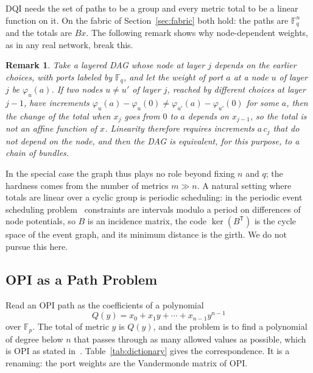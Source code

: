 \documentclass[journal]{IEEEtran}
\newtheorem{remark}{Remark}
\begin{document}
DQI needs the set of paths to be a group and every metric total to be a linear function on it. On the fabric of Section~\ref{sec:fabric} both hold: the paths are $\mathbb{F}_{q}^{n}$ and the totals are $Bx$. The following remark shows why node-dependent weights, as in any real network, break this.

\begin{remark}\label{rem:linear}
Take a layered DAG whose node at layer $j$ depends on the earlier choices, with ports labeled by $\mathbb{F}_{q}$, and let the weight of port $a$ at a node $u$ of layer $j$ be $\varphi_{u}(a)$. If two nodes $u\neq u'$ of layer $j$, reached by different choices at layer $j-1$, have increments $\varphi_{u}(a)-\varphi_{u}(0)\neq\varphi_{u'}(a)-\varphi_{u'}(0)$ for some $a$, then the change of the total when $x_{j}$ goes from $0$ to $a$ depends on $x_{j-1}$, so the total is not an affine function of $x$. Linearity therefore requires increments $a\,c_{j}$ that do not depend on the node, and then the DAG is equivalent, for this purpose, to a chain of bundles.
\end{remark}

In the special case the graph thus plays no role beyond fixing $n$ and $q$; the hardness comes from the number of metrics $m\gg n$. A natural setting where totals are linear over a cyclic group is periodic scheduling: in the periodic event scheduling problem~\cite{serafini1989} constraints are intervals modulo a period on differences of node potentials, so $B$ is an incidence matrix, the code $\ker(B^{\mathsf T})$ is the cycle space of the event graph, and its minimum distance is the girth. We do not pursue this here.

\subsection{OPI as a Path Problem}

Read an OPI path as the coefficients of a polynomial
\begin{equation}
  Q(y) = x_{0} + x_{1}y + \cdots + x_{n-1}y^{n-1}
  \label{eq:poly}
\end{equation}
over $\mathbb{F}_{p}$. The total of metric $y$ is $Q(y)$, and the problem is to find a polynomial of degree below $n$ that passes through as many allowed values as possible, which is OPI as stated in~\cite{jordan2025}. Table~\ref{tab:dictionary} gives the correspondence. It is a renaming: the port weights are the Vandermonde matrix of OPI.
\end{document}
